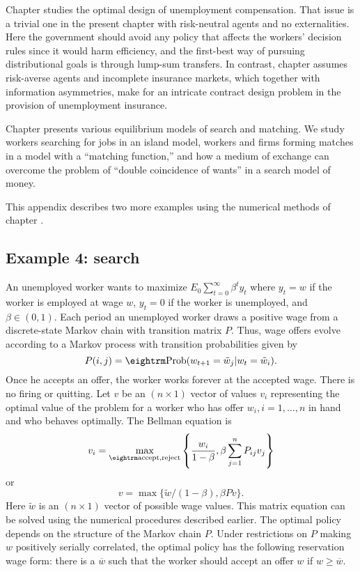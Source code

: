 Chapter 
 studies the optimal design of unemployment compensation.
That issue is a trivial one in the present chapter with risk-neutral
agents and no externalities. Here the government should avoid any
policy that affects the workers' decision rules since it would
harm efficiency, and the first-best way of pursuing distributional
goals is through lump-sum transfers. In contrast, chapter
 assumes
risk-averse agents and incomplete insurance markets, which together with
information asymmetries, make for an intricate contract design problem in
the provision of unemployment insurance.

Chapter 
 presents various equilibrium models of search and matching.
We study workers searching for jobs in an island model, workers and firms
forming matches in a model with a ``matching function,'' and how a medium
of exchange can overcome the problem of ``double coincidence of wants'' in
a search model of money.

\label{searchA}%
This appendix describes two more  examples  using the numerical
methods of chapter .

\subsection{Example 4: search}
 An unemployed worker
wants to maximize $E_0 \sum_{t=0}^\infty \beta^t y_t$
where $y_t=w$ if the worker is employed at wage $w$,
 $y_t= 0$ if the worker is unemployed, and $\beta \in (0,1)$.
  Each period an
unemployed worker draws a  positive wage from a discrete-state Markov chain
with transition matrix $P$. Thus,
  wage offers evolve according to a Markov process with transition
probabilities given by
$$ P(i,j) = {\rm Prob}(w_{t+1}=\tilde w_j \vert
             w_t = \tilde w_i).$$
Once he accepts an offer, the worker  works forever at
the accepted wage.  There is no firing or quitting.
Let $v$ be an $(n \times 1)$ vector of values $v_i$ representing
the optimal value of the problem for a worker who
has offer $w_i, i = 1,\ldots, n$ in hand and who behaves optimally.
The Bellman equation is
$$ v_i = \max_{\rm accept,  reject} \left\{ {w_i \over 1 - \beta},
  \beta \sum_{j=1}^n P_{ij} v_j  \right\}$$
or
$$ v = \max\{\tilde w / (1-\beta), \beta P v\}.$$
Here $\tilde w$ is an $(n \times 1)$ vector of possible wage
values. This matrix equation can be solved using the numerical
procedures described earlier.   The optimal policy
depends on the structure of the Markov chain $P$.   Under
restrictions on $P$ making $w$ positively
serially correlated, the optimal policy
has the following reservation wage form: there is a $\overline w$ such that
the worker should  accept an offer $w$
if $w \geq \overline w$.
